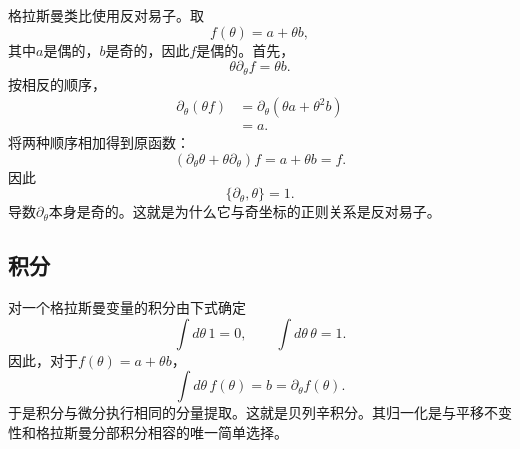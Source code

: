 格拉斯曼类比使用反对易子。取
\begin{equation}
f(\theta)=a+\theta b,
\end{equation}
其中\(a\)是偶的，\(b\)是奇的，因此\(f\)是偶的。首先，
\begin{equation}
\theta\partial_\theta f=\theta b.
\end{equation}
按相反的顺序，
\begin{align}
\partial_\theta(\theta f)
&=\partial_\theta(\theta a+\theta^2b)\\
&=a.
\end{align}
将两种顺序相加得到原函数：
\begin{equation}
\left(\partial_\theta\theta+\theta\partial_\theta\right)f
=a+\theta b=f.
\end{equation}
因此
\begin{equation}
\boxed{\{\partial_\theta,\theta\}=1.}
\end{equation}
导数\(\partial_\theta\)本身是奇的。这就是为什么它与奇坐标的正则关系是反对易子。

\begin{classroomqa}
\end{classroomqa}

\begin{classroomqa}
\end{classroomqa}

\begin{classroomqa}
\end{classroomqa}

\subsection{积分}

对一个格拉斯曼变量的积分由下式确定
\begin{equation}
\int d\theta\,1=0,
\qquad
\int d\theta\,\theta=1.
\end{equation}
因此，对于\(f(\theta)=a+\theta b\)，
\begin{equation}
\int d\theta\,f(\theta)=b=\partial_\theta f(\theta).
\end{equation}
于是积分与微分执行相同的分量提取。这就是贝列辛积分。其归一化是与平移不变性和格拉斯曼分部积分相容的唯一简单选择。

